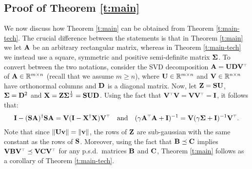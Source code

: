 \documentclass[thesis.tex]{subfiles}
\begin{document}
\subsection{Proof of Theorem \ref{t:main}}\label{s:reduction}
We now discuss how Theorem \ref{t:main} can be obtained from Theorem
\ref{t:main-tech}. The crucial difference between the statements is
that in Theorem \ref{t:main} we let $\A$ be an arbitrary rectangular
matrix, whereas in Theorem \ref{t:main-tech} we instead use a square,
symmetric and positive semi-definite matrix $\Sigmab$. To convert between the
two notations, consider the SVD decomposition
$\A=\U\D\V^\top$ of $\A \in \R^{m \times n}$ (recall that we assume $m
\ge n$), where $\U\in\R^{m\times n}$ and $\V\in\R^{n\times 
  n}$ have orthonormal columns and $\D$ is a diagonal matrix. Now, let
$\Z = \S\U$, $\Sigmab=\D^2$ and  
$\X=\Z\Sigmab^{\frac12}=\S\U\D$. Using the fact that
$\V^\top\V=\V\V^\top=\I$, it follows that:
\begin{align*}
  \I - (\S\A)^\dagger\S\A = \V(\I-\X^\dagger\X)\V^\top\quad\text{and}\quad
  (\gamma\A^\top\A+\I)^{-1} = \V(\gamma\Sigmab + \I)^{-1}\V^\top.
\end{align*}
Note that since $\|\U\v\|=\|\v\|$, the rows of $\Z$ are
sub-gaussian with the same constant as the rows of $\S$. Moreover,
using the fact that $\B\preceq\C$ implies
$\V\B\V^\top\preceq\V\C\V^\top$ for any p.s.d.~matrices $\B$ and $\C$,
Theorem \ref{t:main} follows as a corollary of Theorem \ref{t:main-tech}.

\end{document}
